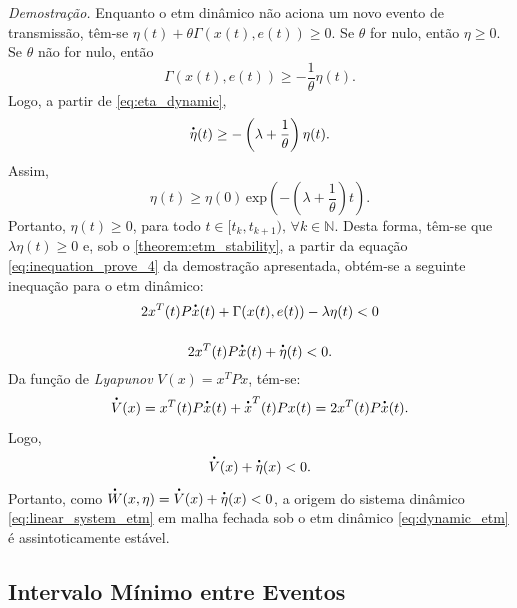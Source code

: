 \noindent \textit{Demostração.} Enquanto o \acrshort{etm} dinâmico não aciona um novo evento de transmissão, têm-se $\eta(t) + \theta \Gamma(x(t), e(t)) \geq 0$. Se $\theta$ for nulo, então $\eta \geq 0$. Se $\theta$ não for nulo, então \begin{equation}
  \Gamma(x(t), e(t)) \geq - \frac{1}{\theta}\eta(t).
\end{equation} Logo, a partir de \eqref{eq:eta_dynamic},  \begin{equation}
  \dt{\eta}(t) \geq - \left(\lambda + \frac{1}{\theta}\right) \eta(t).
\end{equation} Assim, \begin{equation}
  \eta(t) \geq \eta(0) \, \mathrm{exp}\left(-\left(\lambda + \frac{1}{\theta}\right) t\right).
\end{equation} Portanto, $\eta(t) \geq 0$, para todo $t \in [t_k, t_{k+1}), \, \forall k \in \mathbb{N}$. Desta forma, têm-se que $\lambda \eta(t) \geq 0$ e, sob o \autoref{theorem:etm_stability}, a partir da equação \eqref{eq:inequation_prove_4} da demostração apresentada, obtém-se a seguinte inequação para o \acrshort{etm} dinâmico: \begin{gather}
  2x^T(t) P\dt{x}(t) + \Gamma(x(t), e(t)) - \lambda \eta(t) < 0 \notag \\[12pt]
  2x^T(t) P\dt{x}(t) + \dt{\eta}(t) < 0.
\end{gather} Da função de \textit{Lyapunov} $V(x) = x^TPx$, tém-se: \begin{equation}\dt{V}(x) = x^T(t)P\dt{x}(t) + \dt{x}^T(t)Px(t) = 2x^T(t) P\dt{x}(t).\end{equation} Logo, \begin{equation}
  \dt{V}(x) + \dt{\eta}(x) < 0.
\end{equation} Portanto, como $\dt{W}(x, \eta) = \dt{V}(x) + \dt{\eta}(x) < 0$, a origem do sistema dinâmico \eqref{eq:linear_system_etm} em malha fechada sob o \acrshort{etm} dinâmico \eqref{eq:dynamic_etm} é assintoticamente estável.

\subsection{Intervalo Mínimo entre Eventos}

